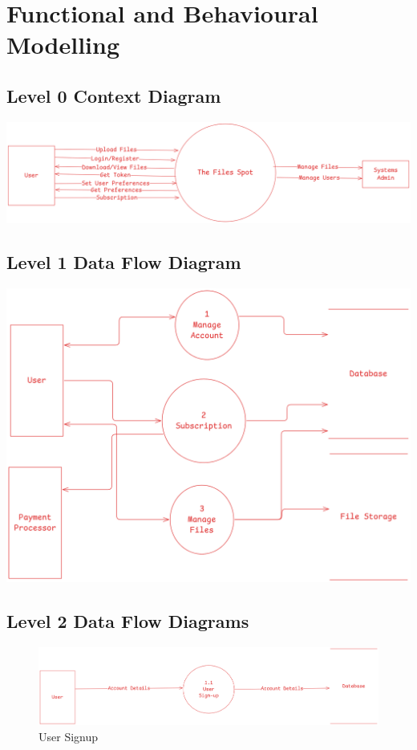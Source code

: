 \documentclass[12pt,a4paper]{report}
\begin{document}
\section{Functional and Behavioural Modelling}\label{sec:functional_and_behavioural_modelling}
\subsection{Level 0 Context Diagram}
\includegraphics[width=\textwidth]{dfd-L0.png}
\subsection{Level 1 Data Flow Diagram}
\includegraphics[width=\textwidth]{dfd-L1.png}
\subsection{Level 2 Data Flow Diagrams}

\begin{figure}[H]
	\includegraphics[width=\textwidth]{dfd-L2-create_user.png}
	\caption{User Signup}
\end{figure}
\end{document}
